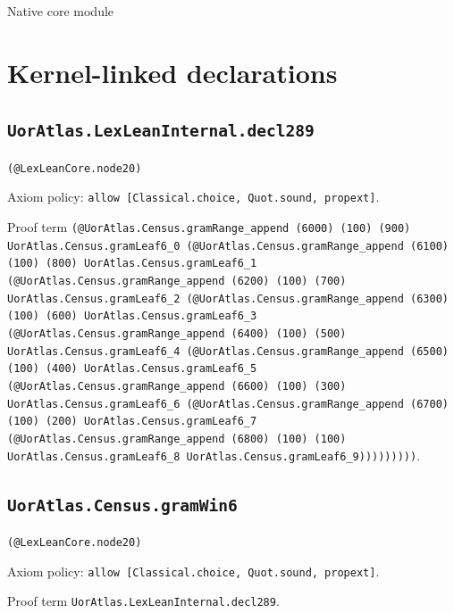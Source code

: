 \documentclass[11pt]{article}
\begin{document}
\begin{center}{\LARGE Native core module}\end{center}
\section*{Kernel-linked declarations}
\subsection*{\texttt{UorAtlas.LexLeanInternal.decl289}}
\noindent\texttt{(@LexLeanCore.node20)}\par
\noindent Axiom policy: \texttt{allow [Classical.choice, Quot.sound, propext]}.\par
\noindent Proof term \texttt{(@UorAtlas.Census.gramRange\_append (6000) (100) (900) UorAtlas.Census.gramLeaf6\_0 (@UorAtlas.Census.gramRange\_append (6100) (100) (800) UorAtlas.Census.gramLeaf6\_1 (@UorAtlas.Census.gramRange\_append (6200) (100) (700) UorAtlas.Census.gramLeaf6\_2 (@UorAtlas.Census.gramRange\_append (6300) (100) (600) UorAtlas.Census.gramLeaf6\_3 (@UorAtlas.Census.gramRange\_append (6400) (100) (500) UorAtlas.Census.gramLeaf6\_4 (@UorAtlas.Census.gramRange\_append (6500) (100) (400) UorAtlas.Census.gramLeaf6\_5 (@UorAtlas.Census.gramRange\_append (6600) (100) (300) UorAtlas.Census.gramLeaf6\_6 (@UorAtlas.Census.gramRange\_append (6700) (100) (200) UorAtlas.Census.gramLeaf6\_7 (@UorAtlas.Census.gramRange\_append (6800) (100) (100) UorAtlas.Census.gramLeaf6\_8 UorAtlas.Census.gramLeaf6\_9)))))))))}.\par
\subsection*{\texttt{UorAtlas.Census.gramWin6}}
\noindent\texttt{(@LexLeanCore.node20)}\par
\noindent Axiom policy: \texttt{allow [Classical.choice, Quot.sound, propext]}.\par
\noindent Proof term \texttt{UorAtlas.LexLeanInternal.decl289}.\par
\end{document}

